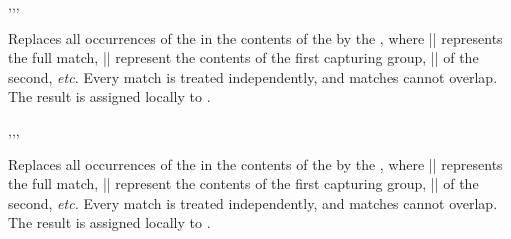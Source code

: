 \documentclass[oneside]{book}
\begin{document}
\begin{function}{\RegexReplaceAll,\RegexReplaceAllT,\RegexReplaceAllF,\RegexReplaceAllTF}
\begin{syntax}
   
    
    
     
\end{syntax}
Replaces all occurrences of the  in the
contents of the 
by the , where |\0| represents
the full match, |\1| represent the contents of the first capturing
group, |\2| of the second, \emph{etc.} Every match is treated
independently, and matches cannot overlap.  The result is assigned
locally to .
\end{function}

\begin{function}{\RegexVarReplaceAll,\RegexVarReplaceAllT,\RegexVarReplaceAllF,\RegexVarReplaceAllTF}
\begin{syntax}
   
    
    
     
\end{syntax}
Replaces all occurrences of the  in the
contents of the 
by the , where |\0| represents
the full match, |\1| represent the contents of the first capturing
group, |\2| of the second, \emph{etc.} Every match is treated
independently, and matches cannot overlap.  The result is assigned
locally to .
\end{function}
\end{document}
